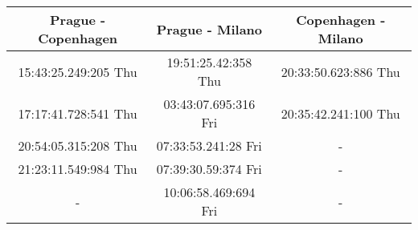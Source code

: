 \begin{tabular}{ccc}
\toprule
Prague - Copenhagen & Prague - Milano & Copenhagen - Milano\\
\midrule
15:43:25.249:205 Thu & 19:51:25.42:358 Thu & 20:33:50.623:886 Thu\\
17:17:41.728:541 Thu & 03:43:07.695:316 Fri & 20:35:42.241:100 Thu\\
20:54:05.315:208 Thu & 07:33:53.241:28 Fri & -\\
21:23:11.549:984 Thu & 07:39:30.59:374 Fri & -\\
- & 10:06:58.469:694 Fri & -\\
\bottomrule
\end{tabular}
